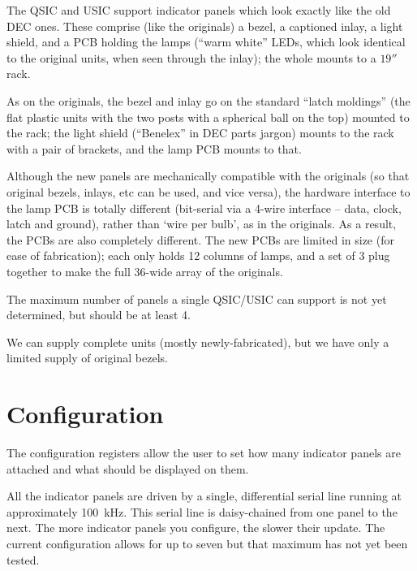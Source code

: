 The QSIC and USIC support indicator panels which look exactly like the old
DEC ones. These comprise (like the originals) a bezel, a captioned inlay, a
light shield, and a PCB holding the lamps (``warm white'' LEDs, which look
identical to the original units, when seen through the inlay); the whole
mounts to a $19''$ rack.

As on the originals, the bezel and inlay go on the standard ``latch moldings''
(the flat plastic units with the two posts with a spherical ball on the top)
mounted to the rack; the light shield (``Benelex'' in DEC parts jargon) mounts
to the rack with a pair of brackets, and the lamp PCB mounts to that.

Although the new panels are mechanically compatible with the originals (so
that original bezels, inlays, etc can be used, and vice versa), the hardware
interface to the lamp PCB is totally different (bit-serial via a 4-wire
interface -- data, clock, latch and ground), rather than `wire per bulb', as
in the originals. As a result, the PCBs are also completely different. The
new PCBs are limited in size (for ease of fabrication); each only holds 12
columns of lamps, and a set of 3 plug together to make the full 36-wide array
of the originals.

The maximum number of panels a single QSIC/USIC can support is not yet
determined, but should be at least 4.

We can supply complete units (mostly newly-fabricated), but we have only a
limited supply of original bezels.

\section{Configuration}

The configuration registers allow the user to set how many indicator
panels are attached and what should be displayed on them.

All the indicator panels are driven by a single, differential serial
line running at approximately 100~kHz.  This serial line is
daisy-chained from one panel to the next.  The more indicator panels
you configure, the slower their update.  The current configuration
allows for up to seven but that maximum has not yet been tested.

\begin{register16}
\end{register16}

